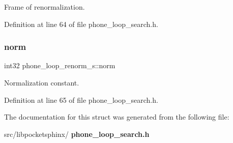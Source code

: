 Frame of renormalization. 



Definition at line 64 of file phone\+\_\+loop\+\_\+search.\+h.

\mbox{\label{structphone__loop__renorm__s_a9a76415892efce2e4b53bc5ea6599010}} 
\subsubsection{norm}
{\footnotesize\ttfamily int32 phone\+\_\+loop\+\_\+renorm\+\_\+s\+::norm}



Normalization constant. 



Definition at line 65 of file phone\+\_\+loop\+\_\+search.\+h.



The documentation for this struct was generated from the following file\+:\begin{DoxyCompactItemize}
\item 
src/libpocketsphinx/\textbf{ phone\+\_\+loop\+\_\+search.\+h}\end{DoxyCompactItemize}
